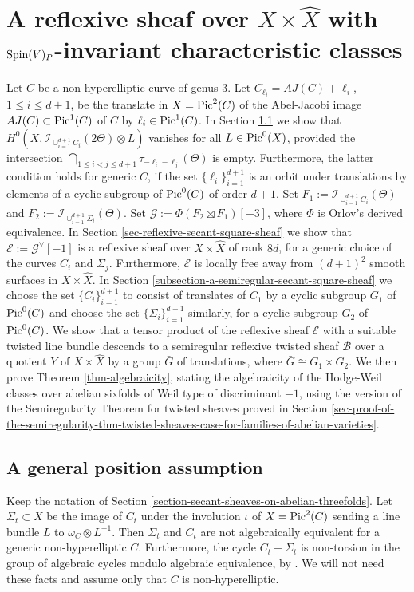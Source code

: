 \documentclass[12pt]{amsart}
\numberwithin{equation}{subsection}
\theoremstyle{plain}
\theoremstyle{definition}
\newcommand{\B}{{\mathcal B}}
\newcommand{\E}{{\mathcal E}}
\newcommand{\G}{{\mathcal G}}
\newcommand{\Spin}{{\rm Spin}}
\newcommand{\Pic}{{\rm Pic}}
\newcommand{\Ideal}[1]{{\mathcal I}_{#1}}
\begin{document}
\section{A reflexive sheaf over $X\times\hat{X}$ with $\Spin(V)_P$-invariant characteristic classes}
\label{section-Jacobians-of-genus-3-curves}
Let $C$ be a non-hyperelliptic curve of genus $3$. Let  $C_{\ell_i}=AJ(C)+\ell_i$, $1\leq i\leq d+1$, be the translate in $X=\Pic^2(C)$ of the Abel-Jacobi image  $AJ(C)\subset \Pic^1(C)$ of $C$ by $\ell_i\in\Pic^1(C)$.
In Section \ref{sec-general-position} we show that $H^0(X,\Ideal{\cup_{i=1}^{d+1}C_i}(2\Theta)\otimes L)$ vanishes for all $L\in \Pic^0(X)$, provided the intersection  $\bigcap_{1\leq i< j\leq d+1}\tau_{-\ell_i-\ell_j}(\Theta)$ is empty. Furthermore, the latter condition holds for generic $C$, if the set $\{\ell_i\}_{i=1}^{d+1}$ is an orbit under translations by elements of a cyclic subgroup of $\Pic^0(C)$ of order $d+1$. Set $F_1:=\Ideal{\cup_{i=1}^{d+1}C_i}(\Theta)$ and
$F_2:=\Ideal{\cup_{i=1}^{d+1}\Sigma_i}(\Theta)$. Set $\G:=\Phi(F_2\boxtimes F_1)[-3]$, where $\Phi$ is Orlov's derived equivalence.
In Section \ref{sec-reflexive-secant-square-sheaf} we show that  $\E:=\G^\vee[-1]$ is a reflexive sheaf over $X\times\hat{X}$ of rank $8d$, for a generic choice of the curves $C_i$ and $\Sigma_j$. Furthermore, $\E$ is locally free away from $(d+1)^2$ smooth surfaces in $X\times\hat{X}$.
In Section \ref{subsection-a-semiregular-secant-square-sheaf} we choose the set $\{C_i\}_{i=1}^{d+1}$ to consist of translates of $C_1$ by a cyclic subgroup $G_1$ of $\Pic^0(C)$ and choose the set $\{\Sigma_i\}_{i=1}^{d+1}$ similarly, for a cyclic subgroup $G_2$ of $\Pic^0(C)$. We show that a tensor product of the reflexive sheaf $\E$ with a suitable twisted line bundle descends to a semiregular reflexive twisted sheaf $\B$ over a quotient $Y$ of $X\times \hat{X}$ by a group $\bar{G}$ of translations, where $\bar{G}\cong G_1\times G_2$. We then prove Theorem \ref{thm-algebraicity}, stating the algebraicity of the Hodge-Weil classes over abelian sixfolds of Weil type of discriminant $-1$, using the version of the Semiregularity Theorem for twisted sheaves proved in Section \ref{sec-proof-of-the-semiregularity-thm-twisted-sheaves-case-for-families-of-abelian-varieties}.


% 
\subsection{A general position assumption}
\label{sec-general-position}
Keep the notation of Section \ref{section-secant-sheaves-on-abelian-threefolds}.
Let $\Sigma_t\subset X$ be the image of $C_t$ under the involution $\iota$ of $X=\Pic^2(C)$ sending
a line bundle $L$ to $\omega_C\otimes L^{-1}$. Then $\Sigma_t$ and $C_t$ are not algebraically equivalent for a generic non-hyperelliptic $C$. Furthermore, the cycle $C_t-\Sigma_t$ is non-torsion in the group of algebraic cycles modulo algebraic equivalence, by \cite{ceresa}.
We will not need these facts and assume only that $C$ is non-hyperelliptic. 
\end{document}
